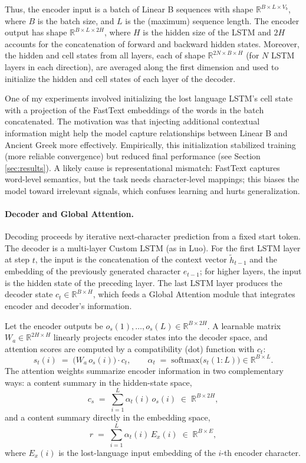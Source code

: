 Thus, the encoder input is a batch of Linear B sequences with shape $\mathbb{R}^{B\times L\times V_b}$, where $B$ is the batch size, and $L$ is the (maximum) sequence length.
The encoder output has shape $\mathbb{R}^{B\times L\times 2H}$, where $H$ is the hidden size of the LSTM and $2H$ accounts for the concatenation of forward and backward hidden states.
Moreover, the hidden and cell states from all layers, each of shape $\mathbb{R}^{2N\times B\times H}$ (for $N$ LSTM layers in each direction), are averaged along the first dimension and used to initialize the hidden and cell states of each layer of the decoder.

One of my experiments involved initializing the lost language LSTM's cell state with a projection of the FastText embeddings of the words in the batch concatenated.
The motivation was that injecting additional contextual information might help the model capture relationships between Linear B and Ancient Greek more effectively.
Empirically, this initialization stabilized training (more reliable convergence) but reduced final performance (see Section \ref{sec:results}).
A likely cause is representational mismatch: FastText captures word-level semantics, but the task needs character-level mappings; this biases the model toward irrelevant signals, which confuses learning and hurts generalization.

\paragraph{Decoder and Global Attention.}
Decoding proceeds by iterative next-character prediction from a fixed start token.
The decoder is a multi-layer Custom LSTM (as in Luo).
For the first LSTM layer at step $t$, the input is the concatenation of the
context vector $\tilde{h}_{t-1}$ and the embedding of the previously generated
character $e_{t-1}$; for higher layers, the input is the hidden state of the
preceding layer.
The last LSTM layer produces the decoder state $c_t\in\mathbb{R}^{B\times H}$,
which feeds a Global Attention module that integrates encoder and decoder’s information.

Let the encoder outputs be $o_s(1),\ldots,o_s(L)\in\mathbb{R}^{B\times 2H}$.
A learnable matrix $W_a\in\mathbb{R}^{2H\times H}$ linearly projects encoder
states into the decoder space, and attention scores are computed by a
compatibility (dot) function with $c_t$:
\[
s_t(i) \;=\; \bigl(W_a\,o_s(i)\bigr)\cdot c_t,
\qquad
\alpha_t \;=\; \mathrm{softmax}\!\bigl(s_t(1{:}L)\bigr)\in\mathbb{R}^{B\times L}.
\]
The attention weights summarize encoder information in two complementary ways:
a content summary in the hidden-state space,
\[
c_s \;=\; \sum_{i=1}^{L} \alpha_t(i)\,o_s(i) \;\in\; \mathbb{R}^{B\times 2H},
\]
and a content summary directly in the embedding space,
\[
r \;=\; \sum_{i=1}^{L} \alpha_t(i)\,E_x(i) \;\in\; \mathbb{R}^{B\times E},
\]
where $E_x(i)$ is the lost-language input embedding of the $i$-th encoder
character.

